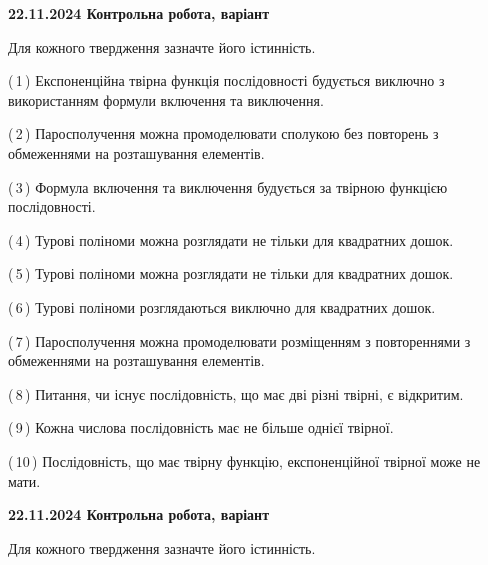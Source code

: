 \documentclass[12pt, ukrainian]{article}
\begin{document}
\begin {large}
\begin {large}
\begin {large}
\begin {large}
\begin {large}
\begin {large}
\begin {large}
\begin {large}
\begin {large}
\begin {large}
\begin {large}
\begin {large}
\begin {large}
\begin {large}
\begin {large}
\begin {large}
\begin {large}
\begin {large}
\begin {large}
\textbf{22.11.2024 Контрольна робота, варіант  }\par


{
Для кожного твердження зазначте його істинність.\par

\vspace{2mm}

(\,1\,) Експоненційна твірна функція послідовності будується виключно з використанням формули включення та виключення.%



(\,2\,) Паросполучення можна промоделювати сполукою без повторень з обмеженнями на розташування елементів.%



(\,3\,) Формула включення та виключення будується за твірною функцією послідовності.%



(\,4\,) Турові поліноми можна розглядати не тільки для квадратних дошок.%



(\,5\,) Турові поліноми можна розглядати не тільки для квадратних дошок.%



(\,6\,) Турові поліноми розглядаються виключно для квадратних дошок.%



(\,7\,) Паросполучення можна промоделювати розміщенням з повтореннями з обмеженнями на розташування елементів.%



(\,8\,) Питання, чи існує послідовність, що має дві різні твірні, є відкритим.%



(\,9\,) Кожна числова послідовність має не більше однієї твірної.%



(\,10\,) Послідовність, що має твірну функцію, експоненційної твірної може не мати.%




\vspace{5mm}
}
\newpage

\begin {large}

\textbf{22.11.2024 Контрольна робота, варіант  }\par


{
Для кожного твердження зазначте його істинність.\par

}
\end{large}
\end{large}
\end{large}
\end{large}
\end{large}
\end{large}
\end{large}
\end{large}
\end{large}
\end{large}
\end{large}
\end{large}
\end{large}
\end{large}
\end{large}
\end{large}
\end{large}
\end{large}
\end{large}
\end{large}
\end{document}
